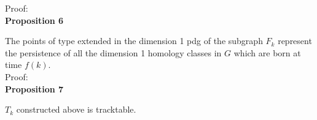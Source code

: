 \documentclass[a4paper,12pt]{article}
\numberwithin{equation}{section}
\begin{document}
	\noindent Proof: \\
	
	\noindent \textbf{Proposition 6}
	
	The points of type extended in the dimension 1 pdg of the subgraph $F_k$ represent the persistence of all the dimension 1 homology classes in $G$ which are born at time $f(k)$. \\
	
	\noindent Proof:\\
	
	
	
	\noindent \textbf{Proposition 7}
	
	$T_k$ constructed above is tracktable.
	
	
	
	
	


	
\end{document}
